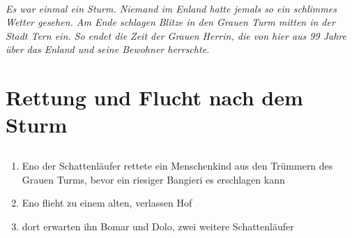 \documentclass[12pt,a4paper,onecolumn,oneside,ngerman]{book}
\newcommand{\Tern}{Tern}
\newcommand{\Bangiri}{Bangieri}
\newcommand{\Enland}{Enland}
\newcommand{\Schattenlaufer}{Schattenläufer}
\newcommand{\Eno}{Eno}
\newcommand{\Bomar}{Bomar}
\newcommand{\Dolo}{Dolo}
\begin{document}
  
  
  
\tableofcontents
  
\clearpage{\pagestyle{empty}\cleardoublepage}
  
\raggedright 
  
\paragraph{}
\textit{Es war einmal ein Sturm.
Niemand im {\Enland} hatte jemals so ein schlimmes Wetter gesehen.
Am Ende schlagen Blitze in den Grauen Turm mitten in der Stadt {\Tern} ein.
So endet die Zeit der Grauen Herrin, die von hier aus 99 Jahre über das {\Enland} und seine Bewohner herrschte.
}

\part{Rettung und Flucht nach dem Sturm}
\chapter[Der {\Schattenlaufer}]{}
\begin{enumerate}
  \item {\Eno} der {\Schattenlaufer} rettete ein Menschenkind aus den Trümmern des Grauen Turms, bevor ein riesiger {\Bangiri} es erschlagen kann
  \item {\Eno} flieht zu einem alten, verlassen Hof
  \item dort erwarten ihn {\Bomar} und {\Dolo}, zwei weitere {\Schattenlaufer}
\end{enumerate}
\end{document}
